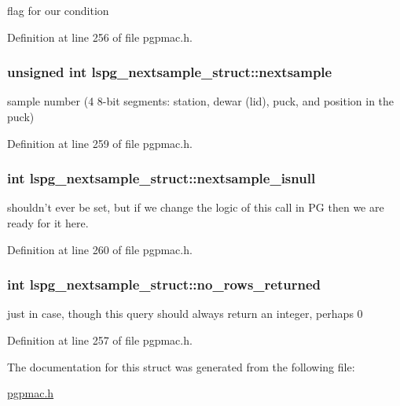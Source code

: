 flag for our condition 



Definition at line 256 of file pgpmac.\-h.

\hypertarget{structlspg__nextsample__struct_aecd82b329462ae06bc2f0d162985a086}{
\subsubsection[{nextsample}]{\setlength{\rightskip}{0pt plus 5cm}unsigned int lspg\-\_\-nextsample\-\_\-struct\-::nextsample}}\label{structlspg__nextsample__struct_aecd82b329462ae06bc2f0d162985a086}


sample number (4 8-\/bit segments\-: station, dewar (lid), puck, and position in the puck) 



Definition at line 259 of file pgpmac.\-h.

\hypertarget{structlspg__nextsample__struct_a2ca6e2a667c9fe7f1a54329de04d2a3c}{
\subsubsection[{nextsample\-\_\-isnull}]{\setlength{\rightskip}{0pt plus 5cm}int lspg\-\_\-nextsample\-\_\-struct\-::nextsample\-\_\-isnull}}\label{structlspg__nextsample__struct_a2ca6e2a667c9fe7f1a54329de04d2a3c}


shouldn't ever be set, but if we change the logic of this call in P\-G then we are ready for it here. 



Definition at line 260 of file pgpmac.\-h.

\hypertarget{structlspg__nextsample__struct_aeee8110133db9f1895237ed9b54dd873}{
\subsubsection[{no\-\_\-rows\-\_\-returned}]{\setlength{\rightskip}{0pt plus 5cm}int lspg\-\_\-nextsample\-\_\-struct\-::no\-\_\-rows\-\_\-returned}}\label{structlspg__nextsample__struct_aeee8110133db9f1895237ed9b54dd873}


just in case, though this query should always return an integer, perhaps 0 



Definition at line 257 of file pgpmac.\-h.



The documentation for this struct was generated from the following file\-:\begin{DoxyCompactItemize}
\item 
\hyperlink{pgpmac_8h}{pgpmac.\-h}\end{DoxyCompactItemize}
